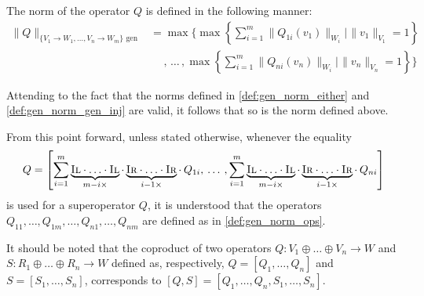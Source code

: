 \begin{definition}
  The norm of the operator $Q$ is defined in the following manner:
  \begin{equation}
    \begin{split}
    \|Q\|_{\{V_1\rightarrow W_1, \ldots, V_n\rightarrow W_m\} \text{ gen}} & =  \max \Bigg\{ \max \left\{ \sum_{i=1}^{m} \|Q_{1i} (v_1)\|_{W_i} | \hspace{1pt} \|v_1\|_{V_1} =1 \right\} \\ 
    & \hspace{15pt},\hspace{2pt} \ldots  \hspace{2pt}, \max \left\{ \sum_{i=1}^{m} \|Q_{ni} (v_n)\|_{W_i}  | \hspace{1pt}  \|v_n\|_{V_n} =1 \right\} \Bigg\}
    \end{split}
  \end{equation}
\end{definition}
Attending to the fact that the norms defined in  \autoref{def:gen_norm_either} and \autoref{def:gen_norm_gen_inj}  are valid, it follows that so is the norm defined above.

\begin{convention}
  From this point forward, unless stated otherwise, whenever the equality 
  $$Q= \left[ \sum_{i=1}^{m} \underbrace{\textsc{Il} \cdot \ldots \cdot \textsc{Il}}_{m-i \times } \cdot  \underbrace{\textsc{Ir} \cdot \ldots \cdot \textsc{Ir}}_{i-1 \times } \cdot  \hspace{2pt} Q_{1i},  \hspace{2pt} \ldots  \hspace{2pt}, \sum_{i=1}^{m} \underbrace{\textsc{Il} \cdot \ldots \cdot \textsc{Il}}_{m-i \times } \cdot  \underbrace{\textsc{Ir} \cdot \ldots \cdot \textsc{Ir}}_{i-1 \times } \cdot  \hspace{2pt} Q_{ni}  \right]$$
   is used for a superoperator $Q$, it is understood that the operators $Q_{11}, \ldots, Q_{1m}, \ldots, Q_{n1}, \ldots, Q_{nm}$ are defined as in \autoref{def:gen_norm_ops}.
\end{convention}

It should be noted that the coproduct of two operators $Q: V_1 \oplus \ldots \oplus V_n \rightarrow W$ and $S: R_1 \oplus \ldots \oplus R_n \rightarrow W$ defined as, respectively, $Q = [Q_1, \ldots, Q_n]$ and $S = [S_1, \ldots, S_n]$, corresponds to $[Q,S] = [Q_1, \ldots, Q_n, S_1, \ldots, S_n]$.

